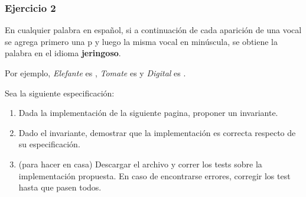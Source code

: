 \begin{frame}\frametitle{Ejercicio 2}\small
	\vspace*{-1em}
	En cualquier palabra en espa\~nol, si a continuaci\'on de cada aparici\'on de una vocal se agrega primero una p y luego la misma vocal en min\'uscula, se obtiene la palabra en el idioma {\bf jeringoso}.\medskip
	
	Por ejemplo, {\it Elefante} es , {\it Tomate} es  y {\it Digital} es .\pause\bigskip
	
	Sea la siguiente especificaci\'on:\medskip
	
	\bigskip
	
	
	\begin{enumerate}[label=(\alph*)]
		\item Dada la implementaci\'on de la siguiente pagina, proponer un invariante.
		
		\item Dado el invariante, demostrar que la implementaci\'on es correcta respecto de su especificaci\'on.
		
		\item (para hacer en casa) Descargar el archivo  y correr los tests sobre la implementaci\'on propuesta. En caso de encontrarse errores, corregir los test hasta que pasen todos.
	\end{enumerate}
	
\end{frame}


